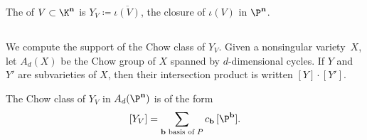 \begin{defi}
  The  of $V \subset \K^{\mathbf n}$ is $Y_V \coloneqq \overline{\iota(V)}$, the closure of $\iota(V)$ in $\P^{\mathbf n}$.
\end{defi}

\subsection{}\label{chowclass}
We compute the support of the Chow class of $Y_V$.
Given a nonsingular variety~$X$, let $A_d(X)$ be the Chow group of $X$ spanned by $d$-dimensional cycles.
If $Y$ and $Y'$ are subvarieties of $X$, then their intersection product is written $[Y] \cdot [Y']$.
\begin{lemm}\label{chowbases}
  The Chow class of $Y_V$ in $A_d(\P^{\mathbf n})$ is of the form
  \[
    [Y_V] = \sum_{\mathbf b \text{ basis of $P$}} c_{\mathbf b}\, [\P^{\mathbf b}].
  \]
\end{lemm}
